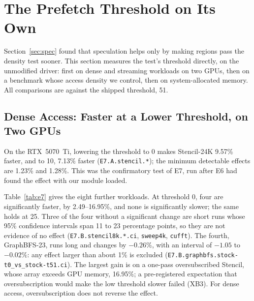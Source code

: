 
\section{The Prefetch Threshold on Its Own}
\label{sec:threshold}

Section~\ref{sec:spec} found that speculation helps only by making regions pass
the density test sooner. This section measures the test's threshold directly,
on the unmodified driver: first on dense and streaming workloads on two GPUs,
then on a benchmark whose access density we control, then on system-allocated
memory. All comparisons are against the shipped threshold, 51.

\subsection{Dense Access: Faster at a Lower Threshold, on Two GPUs}
\label{sec:thr-dense}

On the RTX~5070~Ti, lowering the threshold to 0 makes Stencil-24K 9.57\% faster,
and to 10, 7.13\% faster (\texttt{E7.A.stencil.*}); the minimum detectable
effects are 1.23\% and 1.28\%. This was the confirmatory test of E7, run after
E6 had found the effect with our module loaded.

Table~\ref{tab:e7} gives the eight further workloads. At threshold 0, four are
significantly faster, by 2.49--16.95\%, and none is significantly slower; the
same holds at 25. Three of the four without a significant change are short runs
whose 95\% confidence intervals span 11 to 23 percentage points, so they are not
evidence of no effect (\texttt{E7.B.stencil8k.*.ci}, \texttt{sweep4k},
\texttt{cufft}). The fourth, GraphBFS-23, runs long and changes by $-0.26\%$,
with an interval of $-1.05$ to $-0.02\%$: any effect larger than about 1\% is
excluded (\texttt{E7.B.graphbfs.stock-t0\_vs\_stock-t51.ci}). The largest gain
is on a one-pass oversubscribed Stencil, whose array exceeds GPU memory, 16.95\%; a pre-registered
expectation that oversubscription would make the low threshold slower failed
(XB3). For dense access, oversubscription does not reverse the effect.

